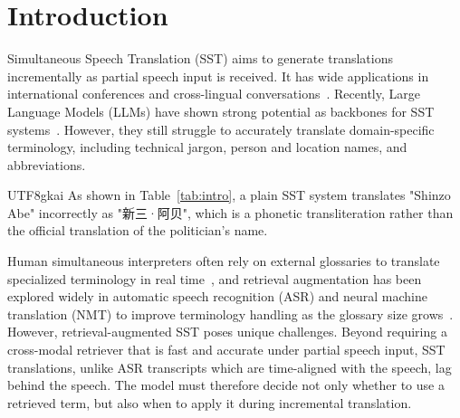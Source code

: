 \section{Introduction}

Simultaneous Speech Translation (SST) aims to generate translations incrementally as partial speech input is received. 
It has wide applications in international conferences and cross-lingual conversations~\citep{ma-etal-2020-simulmt, ren-etal-2020-simulspeech}. 
Recently, Large Language Models (LLMs) have shown strong potential as backbones for SST systems~\citep{wang-etal-2025-conversational, ouyang-etal-2025-infinisst, fu2025efficientadaptivesimultaneousspeech, cheng2025seedliveinterpret20endtoend}. 
However, they still struggle to accurately translate domain-specific terminology, including technical jargon, person and location names, and abbreviations.
\begin{CJK*}{UTF8}{gkai}
As shown in Table~\ref{tab:intro}, a plain SST system translates "Shinzo Abe" incorrectly as "新三·阿贝", which is a phonetic transliteration rather than the official translation of the politician's name. 
\end{CJK*} %

Human simultaneous interpreters often rely on external glossaries to translate specialized terminology in real time~\citep{jbp:/content/journals/10.1075/intp.15.1.04jia}, and retrieval augmentation has been explored widely in automatic speech recognition (ASR) and neural machine translation (NMT) to improve terminology handling as the glossary size grows~\citep{khandelwal2021nearest,9687898,jayanthi-etal-2023-retrieve,li-etal-2024-optimizing-rare,li-etal-2025-leveraging,wu-etal-2025-locate,gong25_interspeech,kong25_interspeech}. 
However, retrieval-augmented SST poses unique challenges. Beyond requiring a cross-modal retriever that is fast and accurate under partial speech input, SST translations, unlike ASR transcripts which are time-aligned with the speech, lag behind the speech. The model must therefore decide not only whether to use a retrieved term, but also when to apply it during incremental translation.

